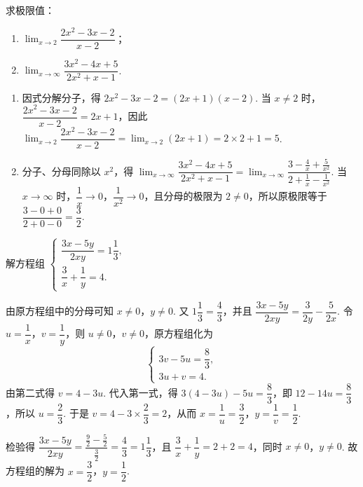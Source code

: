 \begin{problem}
求极限值：

\begin{enumerate}
    \item \(\displaystyle\lim_{x\to2}\dfrac{2x^2-3x-2}{x-2}\)；
    \item \(\displaystyle\lim_{x\to\infty}\dfrac{3x^2-4x+5}{2x^2+x-1}\).
\end{enumerate}
\end{problem}

\begin{solution}
\begin{enumerate}
    \item 因式分解分子，得 \(2x^2-3x-2=(2x+1)(x-2)\). 当 \(x\ne2\) 时，\(\dfrac{2x^2-3x-2}{x-2}=2x+1\)，因此 \(\displaystyle\lim_{x\to2}\dfrac{2x^2-3x-2}{x-2}=\lim_{x\to2}(2x+1)=2\times2+1=5\).
    \item 分子、分母同除以 \(x^2\)，得 \(\displaystyle\lim_{x\to\infty}\dfrac{3x^2-4x+5}{2x^2+x-1}=\lim_{x\to\infty}\dfrac{3-\frac{4}{x}+\frac{5}{x^2}}{2+\frac{1}{x}-\frac{1}{x^2}}\). 当 \(x\to\infty\) 时，\(\dfrac{1}{x}\to0\)，\(\dfrac{1}{x^2}\to0\)，且分母的极限为 \(2\ne0\)，所以原极限等于 \(\dfrac{3-0+0}{2+0-0}=\dfrac{3}{2}\).
\end{enumerate}
\end{solution}

\begin{problem}
解方程组
\(\begin{cases}
\dfrac{3x-5y}{2xy}=1\dfrac{1}{3},\\
\dfrac{3}{x}+\dfrac{1}{y}=4.
\end{cases}\)
\end{problem}

\begin{solution}
由原方程组中的分母可知 \(x\ne0\)，\(y\ne0\). 又 \(1\dfrac{1}{3}=\dfrac{4}{3}\)，并且 \(\dfrac{3x-5y}{2xy}=\dfrac{3}{2y}-\dfrac{5}{2x}\). 令 \(u=\dfrac{1}{x}\)，\(v=\dfrac{1}{y}\)，则 \(u\ne0\)，\(v\ne0\)，原方程组化为
\[
\begin{cases}
3v-5u=\dfrac{8}{3},\\
3u+v=4.
\end{cases}
\]
由第二式得 \(v=4-3u\). 代入第一式，得 \(3(4-3u)-5u=\dfrac{8}{3}\)，即 \(12-14u=\dfrac{8}{3}\)，所以 \(u=\dfrac{2}{3}\). 于是 \(v=4-3\times\dfrac{2}{3}=2\)，从而 \(x=\dfrac{1}{u}=\dfrac{3}{2}\)，\(y=\dfrac{1}{v}=\dfrac{1}{2}\).

检验得 \(\dfrac{3x-5y}{2xy}=\dfrac{\frac{9}{2}-\frac{5}{2}}{\frac{3}{2}}=\dfrac{4}{3}=1\dfrac{1}{3}\)，且 \(\dfrac{3}{x}+\dfrac{1}{y}=2+2=4\)，同时 \(x\ne0\)，\(y\ne0\). 故方程组的解为 \(x=\dfrac{3}{2}\)，\(y=\dfrac{1}{2}\).
\end{solution}

